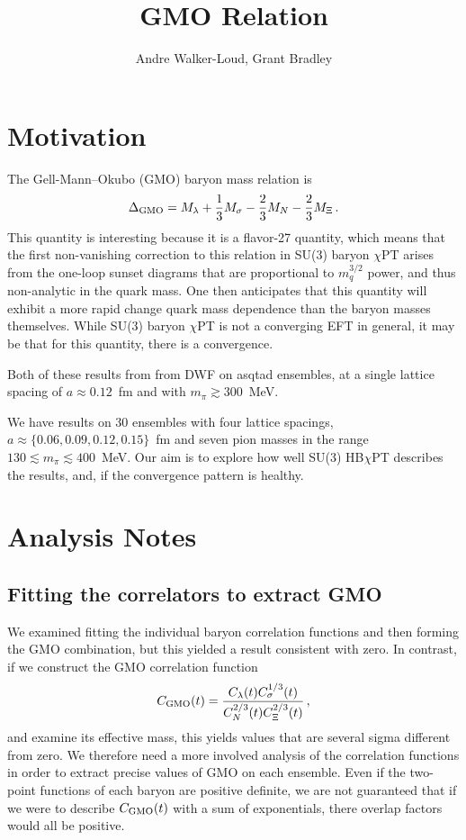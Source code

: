 \documentclass[12pt,tightenlines, raggedbottom, prd, notitlepage]{revtex4-1}
\begin{document}
\title{GMO Relation}
\author{Andre Walker-Loud, Grant Bradley}
\maketitle
\section{Motivation}
The Gell-Mann--Okubo (GMO) baryon mass relation is
\begin{equation}
\Delta_{\rm GMO} = M_\lambda +\frac{1}{3}M_\sigma -\frac{2}{3} M_N -\frac{2}{3} M_\Xi\, .
\end{equation}
This quantity is interesting because it is a flavor-27 quantity, which means that the first non-vanishing correction to this relation in SU(3) baryon $\chi$PT arises from the one-loop sunset diagrams that are proportional to $m_q^{3/2}$ power, and thus non-analytic in the quark mass.
One then anticipates that this quantity will exhibit a more rapid change quark mass dependence than the baryon masses themselves.
While SU(3) baryon $\chi$PT is not a converging EFT in general, it may be that for this quantity, there is a convergence.

Both of these results from from DWF on asqtad ensembles, at a single lattice spacing of $a\approx0.12$~fm and with $m_\pi \gtrsim300$~MeV.

We have results on 30 ensembles with four lattice spacings, $a\approx\{0.06, 0.09, 0.12, 0.15\}$~fm and seven pion masses in the range $130\lesssim m_\pi\lesssim400$~MeV.
Our aim is to explore how well SU(3) HB$\chi$PT describes the results, and, if the convergence pattern is healthy.




\section{Analysis Notes}

\subsection{Fitting the correlators to extract GMO}
We examined fitting the individual baryon correlation functions and then forming the GMO combination, but this yielded a result consistent with zero.
In contrast, if we construct the GMO correlation function
\begin{equation}
C_{\rm GMO}(t) = \frac{C_\lambda(t) C_\sigma^{1/3}(t)}{C_N^{2/3}(t) C_\Xi^{2/3}(t)}\, ,
\end{equation}
and examine its effective mass, this yields values that are several sigma different from zero.
We therefore need a more involved analysis of the correlation functions in order to extract precise values of GMO on each ensemble.
Even if the two-point functions of each baryon are positive definite, we are not guaranteed that if we were to describe $C_{\rm GMO}(t)$ with a sum of exponentials, there overlap factors would all be positive.
\end{document}
